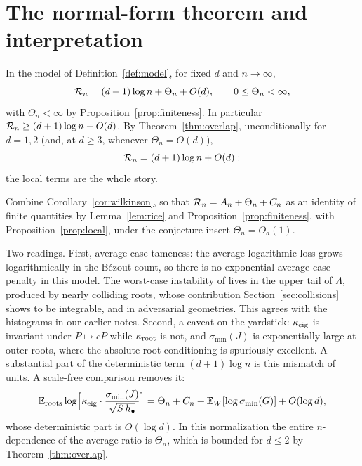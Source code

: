 \section{The normal-form theorem and interpretation}\label{sec:theorem}

\begin{theorem}\label{thm:main}
  In the model of Definition~\ref{def:model}, for fixed $d$ and $n\to\infty$,
  \[
    \mathcal{R}_n = (d+1)\log n + \Theta_n + O(d), \qquad 0\le\Theta_n<\infty,
  \]
  with $\Theta_n<\infty$ by Proposition~\ref{prop:finiteness}. In particular
  $\mathcal{R}_n\ge(d+1)\log n - O(d)$. By Theorem~\ref{thm:overlap}, unconditionally for
  $d=1,2$ (and, at $d\ge3$, whenever $\Theta_n = O(d)$),
  \[
    \mathcal{R}_n = (d+1)\log n + O(d):
  \]
  the local terms are the whole story.
\end{theorem}

\proof
Combine Corollary~\ref{cor:wilkinson}, so that $\mathcal{R}_n = A_n + \Theta_n + C_n$ as an
identity of finite quantities by Lemma~\ref{lem:rice} and
Proposition~\ref{prop:finiteness}, with Proposition~\ref{prop:local}, under the conjecture
insert $\Theta_n = O_d(1)$.
\endproof

\begin{remark}\label{rem:tworeadings}
  Two readings. First, average-case tameness: the average logarithmic loss grows
  logarithmically in the B\'ezout count, so there is no exponential average-case penalty
  in this model. The worst-case instability of
  \cite{noferini2016numerical,graf2026numerical} lives in the upper tail of $\Lambda$,
  produced by nearly colliding roots, whose contribution Section~\ref{sec:collisions}
  shows to be integrable, and in adversarial geometries. This agrees with the histograms
  in our earlier notes. Second, a caveat on the yardstick: $\kappa_{\mathrm{eig}}$ is invariant under
  $P\mapsto cP$ while $\kappa_{\mathrm{root}}$ is not, and $\sigma_{\min}(J)$ is exponentially large at
  outer roots, where the absolute root conditioning is spuriously excellent. A substantial
  part of the deterministic term $(d+1)\log n$ is this mismatch of units. A scale-free
  comparison removes it:
  \[
    \mathbb{E}_{\mathrm{roots}}\log\Bigl[\kappa_{\mathrm{eig}}\cdot\frac{\sigma_{\min}(J)}{\sqrt{S\,h_\bullet}}\Bigr]
    = \Theta_n + C_n + \mathbb{E}_{W}[\log\sigma_{\min}(G)] + O(\log d),
  \]
  whose deterministic part is $O(\log d)$. In this normalization the entire
  $n$-dependence of the average ratio is $\Theta_n$, which is bounded for $d\le2$ by
  Theorem~\ref{thm:overlap}.
\end{remark}

